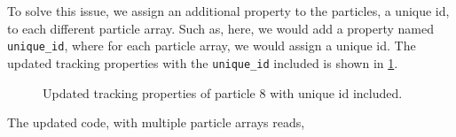 To solve this issue, we assign an additional property to the particles, a unique
id, to each different particle array. Such as, here, we would add a property
named \texttt{unique\_id}, where for each particle array, we would assign a
unique id. The updated tracking properties with the \texttt{unique\_id} included
is shown in \cref{fig:mb-ui-included}.
\begin{figure}[!htpb]
  \centering
  \caption{Updated tracking properties of particle $8$ with unique id included.}
\label{fig:mb-ui-included}
\end{figure}
The updated code, with multiple particle arrays reads,
 \lstset{basicstyle=\footnotesize\ttfamily}
